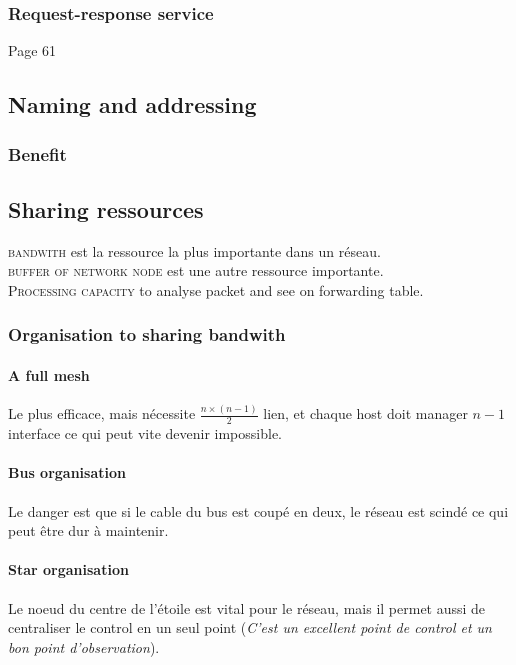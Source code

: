 \subsubsection{Request-response service}

Page 61

\subsection{Naming and addressing}

\subsubsection{Benefit}

\subsection{Sharing ressources}

\textsc{bandwith} est la ressource la plus importante dans un réseau.\\
\textsc{buffer of network node} est une autre ressource importante.\\
\textsc{Processing capacity} to analyse packet and see on forwarding table.

\subsubsection{Organisation to sharing bandwith}

\paragraph{A full mesh}
Le plus efficace, mais nécessite $\frac{n \times (n-1)}{2}$ lien, et chaque
host doit manager $n-1$ interface ce qui peut vite devenir impossible.

\paragraph{Bus organisation}
Le danger est que si le cable du bus est coupé en deux, le réseau est scindé
ce qui peut être dur à maintenir.

\paragraph{Star organisation}
Le noeud du centre de l'étoile est vital pour le réseau, mais il permet aussi
de centraliser le control en un seul point (\textit{C'est un excellent point de
control et un bon point d'observation}).

